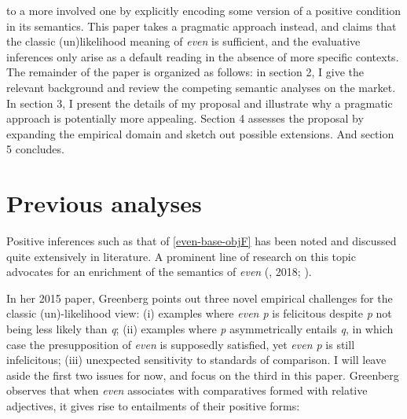 \documentclass[12pt,letterpaper]{scrartcl}
\begin{document}
to a more involved one by explicitly encoding some version of a positive condition in its semantics. %
%
This paper takes a pragmatic approach instead, and claims that the classic (un)likelihood meaning of \textit{even} is sufficient, and the evaluative inferences only arise as a default reading in the absence of more specific contexts. The remainder of the paper is organized as follows: in section 2, I give the relevant background and review the competing semantic analyses on the market. In section 3, I present the details of my proposal and illustrate why a pragmatic approach is potentially more appealing. Section 4 assesses the proposal by expanding the empirical domain and sketch out possible extensions. And section 5 concludes.


\section{Previous analyses}

Positive inferences such as that of \ref{even-base-objF} has been noted and discussed quite extensively in literature.  A prominent line of research on this topic advocates for an enrichment of the semantics of \textit{even} (\cite{greenberg_even_2015}, 2018; \cite{daniels_even_2020}). 

In her 2015 paper, Greenberg points out three novel empirical challenges for the classic (un)-likelihood view: (i) examples where \textit{even p} is felicitous despite \textit{p} not being less likely than \textit{q}; (ii) examples where \textit{p} asymmetrically entails \textit{q}, in which case the presupposition of \textit{even} is supposedly satisfied, yet \textit{even p} is still infelicitous; (iii) unexpected sensitivity to standards of comparison. I will leave aside the first two issues for now, and focus on the third in this paper. Greenberg observes that when \textit{even} associates with comparatives formed with relative adjectives, it gives rise to entailments of their positive forms:
\end{document}
